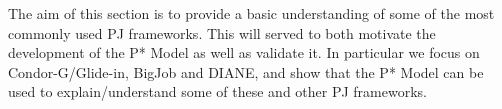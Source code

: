 \documentclass[conference]{IEEEtran}
\begin{document}



The aim of this section is to provide a basic understanding of some of
the most commonly used PJ frameworks. This will served to both
motivate the development of the P* Model as well as validate it.  In
particular we focus on Condor-G/Glide-in, BigJob and DIANE, and show
that the P* Model can be used to explain/understand some of these and
other PJ frameworks.


\end{document}
